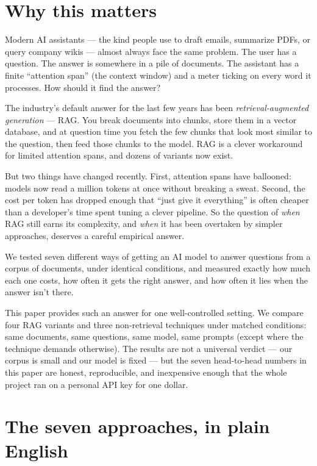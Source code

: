 \documentclass[11pt,a4paper]{article}
\begin{document}
\section{Why this matters}

Modern AI assistants — the kind people use to draft emails, summarize PDFs, or query company wikis — almost always face the same problem. The user has a question. The answer is somewhere in a pile of documents. The assistant has a finite ``attention span'' (the context window) and a meter ticking on every word it processes. How should it find the answer?

The industry's default answer for the last few years has been \emph{retrieval-augmented generation} — RAG. You break documents into chunks, store them in a vector database, and at question time you fetch the few chunks that look most similar to the question, then feed those chunks to the model. RAG is a clever workaround for limited attention spans, and dozens of variants now exist.

But two things have changed recently. First, attention spans have ballooned: models now read a million tokens at once without breaking a sweat. Second, the cost per token has dropped enough that ``just give it everything'' is often cheaper than a developer's time spent tuning a clever pipeline. So the question of \emph{when} RAG still earns its complexity, and \emph{when} it has been overtaken by simpler approaches, deserves a careful empirical answer.

\begin{plainEnglish}
We tested seven different ways of getting an AI model to answer questions from a corpus of documents, under identical conditions, and measured exactly how much each one costs, how often it gets the right answer, and how often it lies when the answer isn't there.
\end{plainEnglish}

This paper provides such an answer for one well-controlled setting. We compare four RAG variants and three non-retrieval techniques under matched conditions: same documents, same questions, same model, same prompts (except where the technique demands otherwise). The results are not a universal verdict — our corpus is small and our model is fixed — but the seven head-to-head numbers in this paper are honest, reproducible, and inexpensive enough that the whole project ran on a personal API key for one dollar.

\section{The seven approaches, in plain English}
\end{document}
